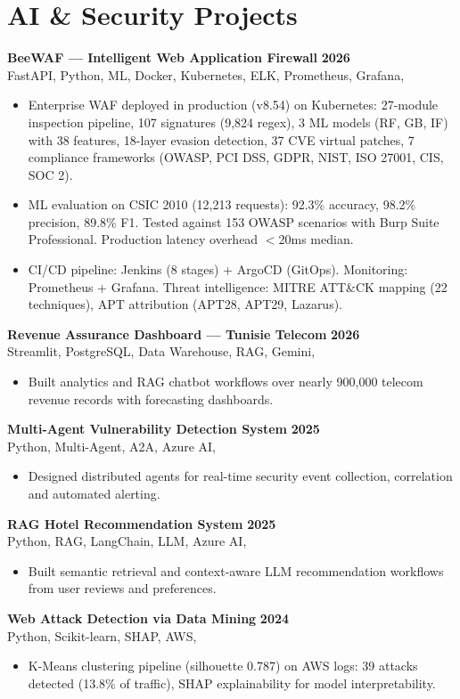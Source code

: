 \documentclass[a4paper,10pt]{article}
\newcommand{\cventry}[4]{\textbf{#1} \hfill \textbf{#4}\\[1pt]#2{\ifx\relax#3\relax\else, #3\fi}\par\vspace{2pt}}
\begin{document}
\section{AI \& Security Projects}
\cventry{BeeWAF — Intelligent Web Application Firewall}{FastAPI, Python, ML, Docker, Kubernetes, ELK, Prometheus, Grafana}{}{2026}
\begin{itemize}
  \item Enterprise WAF deployed in production (v8.54) on Kubernetes: 27-module inspection pipeline, 107 signatures (9,824 regex), 3 ML models (RF, GB, IF) with 38 features, 18-layer evasion detection, 37 CVE virtual patches, 7 compliance frameworks (OWASP, PCI DSS, GDPR, NIST, ISO 27001, CIS, SOC 2).
  \item ML evaluation on CSIC 2010 (12,213 requests): 92.3\% accuracy, 98.2\% precision, 89.8\% F1. Tested against 153 OWASP scenarios with Burp Suite Professional. Production latency overhead $<$20ms median.
  \item CI/CD pipeline: Jenkins (8 stages) + ArgoCD (GitOps). Monitoring: Prometheus + Grafana. Threat intelligence: MITRE ATT\&CK mapping (22 techniques), APT attribution (APT28, APT29, Lazarus).
\end{itemize}
\cventry{Revenue Assurance Dashboard — Tunisie Telecom}{Streamlit, PostgreSQL, Data Warehouse, RAG, Gemini}{}{2026}
\begin{itemize}
  \item Built analytics and RAG chatbot workflows over nearly 900,000 telecom revenue records with forecasting dashboards.
\end{itemize}
\cventry{Multi-Agent Vulnerability Detection System}{Python, Multi-Agent, A2A, Azure AI}{}{2025}
\begin{itemize}
  \item Designed distributed agents for real-time security event collection, correlation and automated alerting.
\end{itemize}
\cventry{RAG Hotel Recommendation System}{Python, RAG, LangChain, LLM, Azure AI}{}{2025}
\begin{itemize}
  \item Built semantic retrieval and context-aware LLM recommendation workflows from user reviews and preferences.
\end{itemize}
\cventry{Web Attack Detection via Data Mining}{Python, Scikit-learn, SHAP, AWS}{}{2024}
\begin{itemize}
  \item K-Means clustering pipeline (silhouette 0.787) on AWS logs: 39 attacks detected (13.8\% of traffic), SHAP explainability for model interpretability.
\end{itemize}
\end{document}
